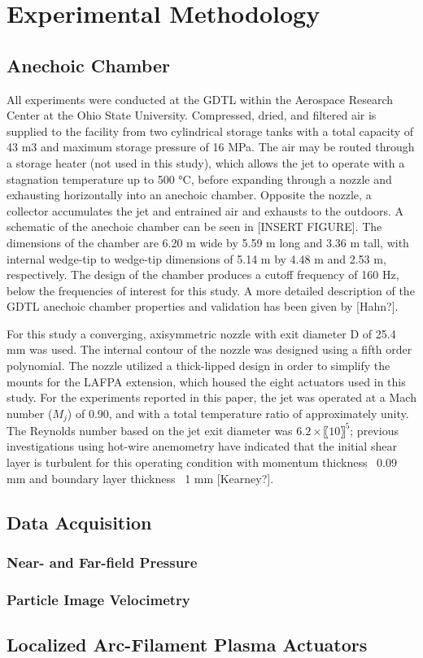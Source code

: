 \chapter{Experimental Methodology}
\label{methodology}

\section{Anechoic Chamber}
All experiments were conducted at the GDTL within the Aerospace Research Center at the Ohio State University. 
Compressed, dried, and filtered air is supplied to the facility from two cylindrical storage tanks with a total capacity of 43 m3 and maximum storage pressure of 16 MPa.
The air may be routed through a storage heater (not used in this study), which allows the jet to operate with a stagnation temperature up to 500 °C, before expanding through a nozzle and exhausting horizontally into an anechoic chamber. 
Opposite the nozzle, a collector accumulates the jet and entrained air and exhausts to the outdoors. 
A schematic of the anechoic chamber can be seen in [INSERT FIGURE]. 
The dimensions of the chamber are 6.20 m wide by 5.59 m long and 3.36 m tall, with internal wedge-tip to wedge-tip dimensions of 5.14 m by 4.48 m and 2.53 m, respectively. 
The design of the chamber produces a cutoff frequency of 160 Hz, below the frequencies of interest for this study. 
A more detailed description of the GDTL anechoic chamber properties and validation has been given by [Hahn?].

For this study a converging, axisymmetric nozzle with exit diameter D of 25.4 mm was used. 
The internal contour of the nozzle was designed using a fifth order polynomial. 
The nozzle utilized a thick-lipped design in order to simplify the mounts for the LAFPA extension, which housed the eight actuators used in this study. 
For the experiments reported in this paper, the jet was operated at a Mach number ($M_j$) of 0.90, and with a total temperature ratio of approximately unity. 
The Reynolds number based on the jet exit diameter was $6.2 \times〖10〗^5$; previous investigations using hot-wire anemometry have indicated that the initial shear layer is turbulent for this operating condition with momentum thickness ~0.09 mm and boundary layer thickness ~1 mm [Kearney?].
\section{Data Acquisition}
\subsection{Near- and Far-field Pressure}
\subsection{Particle Image Velocimetry}

\section{Localized Arc-Filament Plasma Actuators}